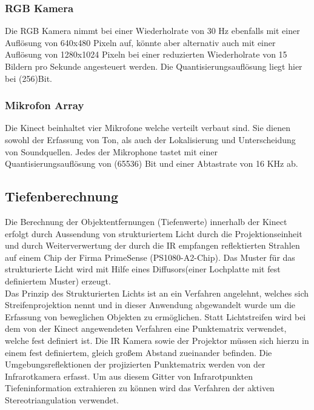 \subsubsection{RGB Kamera}

Die RGB Kamera nimmt bei einer Wiederholrate von 30 Hz ebenfalls mit einer Auflösung von 640x480 Pixeln auf, könnte aber alternativ auch mit einer Auflösung von 1280x1024 Pixeln bei einer reduzierten Wiederholrate von 15 Bildern pro Sekunde angesteuert werden.
Die Quantisierungsauflösung liegt hier bei  (256)Bit. \\


\subsubsection{Mikrofon Array}
Die Kinect beinhaltet vier Mikrofone welche verteilt verbaut sind. Sie dienen sowohl der Erfassung von Ton, als auch der Lokalisierung und Unterscheidung von Soundquellen. Jedes der Mikrophone tastet mit einer Quantisierungsauflösung von  (65536) Bit und einer Abtastrate von 16 KHz ab.

\subsection{Tiefenberechnung}

Die Berechnung der Objektentfernungen (Tiefenwerte) innerhalb der Kinect erfolgt durch Aussendung von strukturiertem Licht durch die Projektionseinheit und durch Weiterverwertung  der durch die IR empfangen reflektierten Strahlen auf einem Chip der Firma PrimeSense (PS1080-A2-Chip). Das Muster für das strukturierte Licht wird mit Hilfe eines Diffusors(einer Lochplatte mit fest definiertem Muster) erzeugt.\\
Das Prinzip des Strukturierten Lichts ist an ein Verfahren angelehnt, welches sich Streifenprojektion nennt und in dieser Anwendung abgewandelt wurde um die Erfassung von beweglichen Objekten zu ermöglichen. Statt Lichtstreifen wird bei dem von der Kinect angewendeten Verfahren eine Punktematrix verwendet, welche fest definiert ist. Die IR Kamera sowie der Projektor müssen sich hierzu in einem fest definiertem, gleich großem Abstand zueinander befinden.
Die Umgebungsreflektionen der projizierten Punktematrix werden von der Infrarotkamera erfasst.
Um aus diesem Gitter von Infrarotpunkten Tiefeninformation extrahieren zu können wird das Verfahren der aktiven Stereotriangulation verwendet.\\


